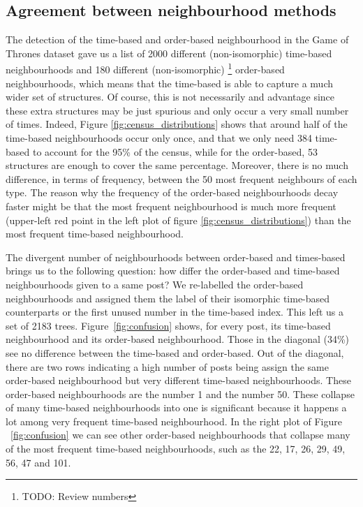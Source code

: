 \documentclass[conference]{IEEEtran}
\begin{document}
\subsection{Agreement between neighbourhood methods}
The detection of the time-based and order-based neighbourhood in the Game of Thrones dataset gave us a list of 2000 different (non-isomorphic) time-based neighbourhoods and 180 different (non-isomorphic) \footnote{TODO: Review numbers} order-based neighbourhoods, which means that the time-based is able to capture a much wider set of structures. Of course, this is not necessarily and advantage since these extra structures may be just spurious and only occur a very small number of times. Indeed, Figure \ref{fig:census_distributions} shows that around half of the time-based neighbourhoods occur only once, and that we only need 384 time-based to account for the 95\% of the census, while for the order-based, 53 structures are enough to cover the same percentage. Moreover, there is no much difference, in terms of frequency, between the 50 most frequent neighbours of each type. The reason why the frequency of the order-based neighbourhoods decay faster might be that the most frequent neighbourhood is much more frequent (upper-left red point in the left plot of figure \ref{fig:census_distributions}) than the most frequent time-based neighbourhood.  


The divergent number of neighbourhoods between order-based and times-based brings us to the following question:  how differ the order-based and time-based neighbourhoods given to a same post? We re-labelled the order-based neighbourhoods and assigned them the label of their isomorphic time-based counterparts or the first unused number in the time-based index. This left us a set of 2183 trees. Figure~\ref{fig:confusion} shows, for every post, its time-based neighbourhood and its order-based neighbourhood. Those in the diagonal (34\%) see no difference between the time-based and order-based. Out of the diagonal, there are two rows indicating a high number of posts being assign the same order-based neighbourhood but very different time-based neighbourhoods. These order-based neighbourhoods are the number 1 and the number 50. These collapse of many time-based neighbourhoods into one is significant because it happens a lot among very frequent time-based neighbourhood. In the right plot of Figure ~\ref{fig:confusion} we can see other order-based neighbourhoods that collapse many of the most frequent time-based neighbourhoods, such as the 22, 17, 26, 29, 49, 56, 47 and 101. 
\end{document}
